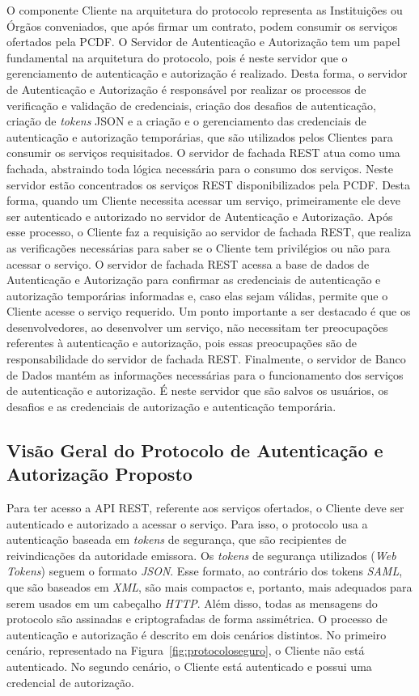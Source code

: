 O componente Cliente na arquitetura do protocolo representa as Instituições ou Órgãos conveniados, que após firmar um contrato, podem consumir os serviços ofertados pela PCDF.
O Servidor de Autenticação e Autorização tem um papel fundamental na arquitetura do protocolo, pois é neste servidor que o gerenciamento de autenticação e autorização é realizado. Desta forma, o servidor de Autenticação e Autorização é responsável por realizar os processos de verificação e validação de credenciais, criação dos desafios de autenticação, criação de \emph{tokens} JSON e a criação e o gerenciamento das credenciais de autenticação e autorização temporárias, que são utilizados pelos Clientes para consumir os serviços requisitados.
O servidor de fachada REST atua como uma fachada, abstraindo toda lógica necessária para o consumo dos serviços. Neste servidor estão concentrados os serviços REST disponibilizados pela PCDF. Desta forma, quando um Cliente necessita acessar um serviço, primeiramente ele deve ser autenticado e autorizado no servidor de Autenticação e Autorização. Após esse processo, o Cliente faz a requisição ao servidor de fachada REST, que realiza as verificações necessárias para saber se o Cliente tem privilégios ou não para acessar o serviço. O servidor de fachada REST acessa a base de dados de Autenticação e Autorização para confirmar as credenciais de autenticação e autorização temporárias informadas e, caso elas sejam válidas, permite que o Cliente acesse o serviço requerido. Um ponto importante a ser destacado é que os desenvolvedores, ao desenvolver um serviço, não necessitam ter preocupações referentes à autenticação e autorização, pois essas preocupações são de responsabilidade do servidor de fachada REST. Finalmente, o servidor de Banco de Dados mantém as informações necessárias para o funcionamento dos serviços de autenticação e autorização. É neste servidor que são salvos os usuários, os desafios e as credenciais de autorização e autenticação temporária.


\subsection{Visão Geral do Protocolo de Autenticação e Autorização Proposto}

Para ter acesso a API REST, referente aos serviços ofertados, o Cliente deve ser autenticado e autorizado a acessar o serviço. Para isso, o protocolo usa a autenticação baseada em \emph{tokens} de segurança, que são recipientes de reivindicações da autoridade emissora. Os \emph{tokens} de segurança utilizados (\emph{Web Tokens}) seguem o formato \emph{JSON}. Esse formato, ao contrário dos tokens \emph{SAML}, que são baseados em \emph{XML}, são mais compactos e, portanto, mais adequados para serem usados em um cabeçalho \emph{HTTP}. Além disso, todas as mensagens do protocolo são assinadas e criptografadas de forma assimétrica. O processo de autenticação e autorização é descrito em dois cenários distintos. No primeiro cenário, representado na Figura~\ref{fig:protocoloseguro}, o Cliente não está autenticado. No segundo cenário, o Cliente está autenticado e possui uma credencial de autorização. %


